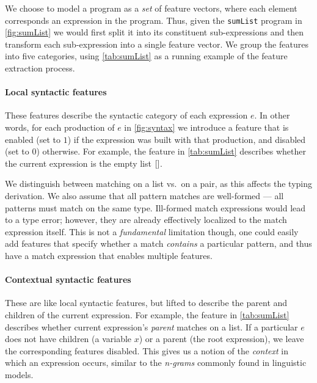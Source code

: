 We choose to model a program as a \emph{set} of feature vectors, where
each element corresponds an expression in the program.
%
Thus, given the \lstinline!sumList! program in \autoref{fig:sumList} we
would first split it into its constituent sub-expressions and then
transform each sub-expression into a single feature vector.
%
We group the features into five categories, using \autoref{tab:sumList}
as a running example of the feature extraction process.

\paragraph{Local syntactic features}
These features describe the syntactic category of each expression $e$.
%
In other words, for each production of $e$ in \autoref{fig:syntax} we
introduce a feature that is enabled (set to $1$) if the expression was
built with that production, and disabled (set to $0$) otherwise.
%
For example, the \IsNil feature in \autoref{tab:sumList} describes
whether the current expression is the empty list $\mathtt{[]}$.

We distinguish between matching on a list vs.\ on a pair, as this
affects the typing derivation.
%
We also assume that all pattern matches are well-formed --- \ie all
patterns must match on the same type.
%
Ill-formed match expressions would lead to a type error; however, they
are already effectively localized to the match expression itself.
%
This is not a \emph{fundamental} limitation though, one could easily add
features that specify whether a match \emph{contains} a particular
pattern, and thus have a match expression that enables multiple
features. 

\paragraph{Contextual syntactic features}
These are like local syntactic features, but lifted to describe the
parent and children of the current expression.
%
For example, the \IsCaseListP feature in \autoref{tab:sumList} describes
whether current expression's \emph{parent} matches on a list.
%
If a particular $e$ does not have children (\eg a variable $x$) or a
parent (\ie the root expression), we leave the corresponding features
disabled.
%
This gives us a notion of the \emph{context} in which an expression
occurs, similar to the \emph{n-grams} commonly found in linguistic
models.

